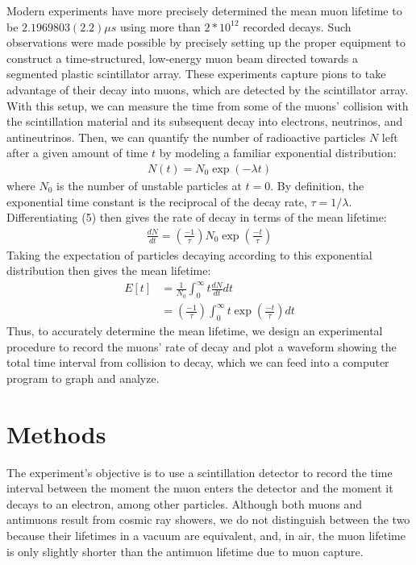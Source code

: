\documentclass[
 reprint,
 twocolumn,
 amsmath,amssymb,
 aps,
 pra,
 floatfix,
]{revtex4-1}
\begin{document}
Modern experiments have more precisely determined the mean muon lifetime to be
$2.1969803(2.2) \mu s$ using more than $2 * 10^{12}$ recorded decays.
Such observations were made possible by precisely setting up the proper equipment
to construct a time-structured, low-energy muon beam directed towards a segmented
plastic scintillator array.\cite{PhysRevLett.106.041803} These experiments
capture pions to take advantage of their decay into muons, which are detected
by the scintillator array. With this setup, we can measure the time from some of the
muons' collision with the scintillation material and its subsequent decay into
electrons, neutrinos, and antineutrinos. Then, we can quantify
the number of radioactive particles $N$ left after a given amount of time $t$ by
modeling a familiar exponential distribution:
\begin{align}
    N(t) = N_0 \exp(-\lambda t)
\end{align}
where $N_0$ is the number of unstable particles at $t = 0$. By definition, the
exponential time constant is the reciprocal of the decay rate, $\tau = 1/\lambda$.
Differentiating (5) then gives the rate of decay in terms of the mean lifetime:
\begin{align}
    \frac{dN}{dt} = (\frac{-1}{\tau})N_0\exp(\frac{-t}{\tau})
\end{align}
Taking the expectation of particles decaying according to this exponential
distribution then gives the mean lifetime:
\begin{align}
    E[t] &= \frac{1}{N_0}\int_0^\infty t \frac{dN}{dt} dt\\
    &= (\frac{-1}{\tau})\int_0^\infty t \exp(\frac{-t}{\tau}) dt
\end{align}
Thus, to accurately determine the mean lifetime, we design an experimental
procedure to record the muons' rate of decay and plot a waveform showing the
total time interval from collision to decay, which we can feed into a computer
program to graph and analyze.

\section{Methods}
The experiment's objective is to use a scintillation detector to record the time
interval between the moment the muon enters the detector and the moment it
decays to an electron, among other particles. Although
both muons and antimuons result from cosmic ray showers, we do not distinguish
between the two because their lifetimes in a vacuum are equivalent, and, in air,
the muon lifetime is only slightly shorter than the antimuon lifetime due to
muon capture.
\end{document}
